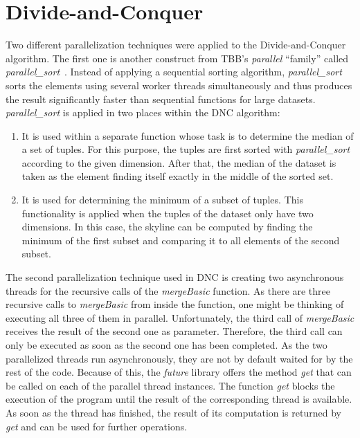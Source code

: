 \section{Divide-and-Conquer}
Two different parallelization techniques were applied to the Divide-and-Conquer algorithm. The first one is another construct from TBB's \textit{parallel} ``family'' called \textit{parallel\_sort}~\cite{parallel-sort}. %
Instead of applying a sequential sorting algorithm, \textit{parallel\_sort} sorts the elements using several worker threads simultaneously and thus produces the result significantly faster than sequential functions for large datasets. \textit{parallel\_sort} is applied in two places within the DNC algorithm: 
\begin{enumerate}
	\item It is used within a separate function whose task is to determine the median of a set of tuples. For this purpose, the tuples are first sorted with \textit{parallel\_sort} according to the given dimension. After that, the median of the dataset is taken as the element finding itself exactly in the middle of the sorted set. 
	\item It is used for determining the minimum of a subset of tuples. This functionality is applied when the tuples of the dataset only have two dimensions. In this case, the skyline can be computed by finding the minimum of the first subset and comparing it to all elements of the second subset. %
\end{enumerate}
The second parallelization technique used in DNC is creating two asynchronous threads for the recursive calls of the \textit{mergeBasic} function. As there are three recursive calls to \textit{mergeBasic} from inside the function, one might be thinking of executing all three of them in parallel. Unfortunately, the third call of \textit{mergeBasic} receives the result of the second one as parameter. Therefore, the third call can only be executed as soon as the second one has been completed. As the two parallelized threads run asynchronously, they are not by default waited for by the rest of the code. Because of this, the \textit{future} library offers the method \textit{get} that can be called on each of the parallel thread instances. The function \textit{get} blocks the execution of the program until the result of the corresponding thread is available. As soon as the thread has finished, the result of its computation is returned by \textit{get} and can be used for further operations. 

